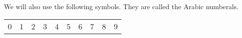 
We will also use the following symbols.
They are called the Arabic numberals.
\begin{center}
\begin{tabular}{cccccccccc}
  0 & 1 & 2 & 3 & 4 & 5 & 6 & 7 & 8 & 9\\
\end{tabular}
\end{center}







